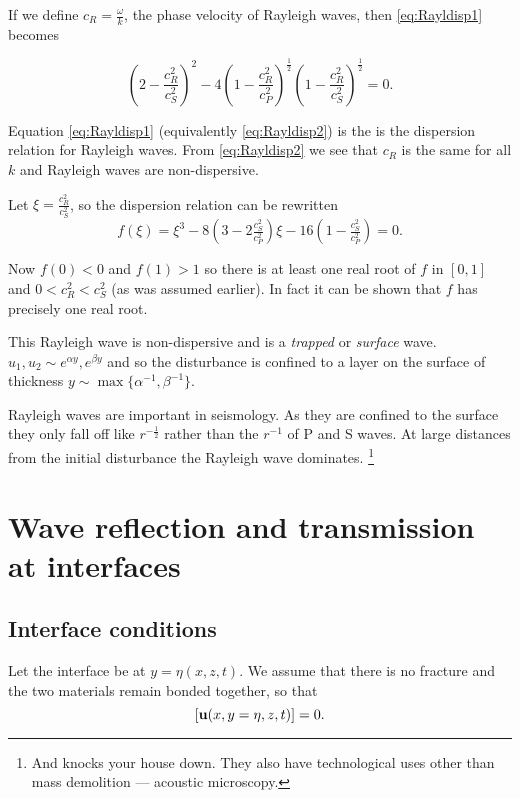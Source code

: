 \documentclass{notes}
\begin{document}
If we define $c_R = \tfrac{\omega}{k}$, the phase velocity of Rayleigh
waves, then \eqref{eq:Rayldisp1} becomes

\begin{equation}\label{eq:Rayldisp2}
\left( 2- \frac{c_R^2}{c_S^2} \right)^2 - 4 \left(1 - \frac{c_R^2}{c_P^2}
\right)^{\frac{1}{2}}
\left( 1 - \frac{c_R^2}{c_S^2} \right)^{\frac{1}{2}} = 0.
\end{equation}

Equation \eqref{eq:Rayldisp1} (equivalently \eqref{eq:Rayldisp2}) is the
is the dispersion relation for Rayleigh waves.  From \eqref{eq:Rayldisp2}
we see that $c_R$ is the same for all $k$ and Rayleigh waves are
non-dispersive.

Let $\xi = \tfrac{c_R^2}{c_S^2}$, so the dispersion relation can
be rewritten
\[
f(\xi) = \xi^3 - 8 \left( 3 - 2 \tfrac{c_S^2}{c_P^2}\right) \xi
- 16 \left(1 - \tfrac{c_S^2}{c_P^2}\right) = 0.
\] 

Now $f(0) < 0$ and $f(1) > 1$ so there is at least one real root of
$f$ in $[0,1]$ and $0 < c_R^2 < c_S^2$ (as was assumed earlier).  In fact
it can be shown that $f$ has precisely one real root.

This Rayleigh wave is non-dispersive and is a \emph{trapped} or
\emph{surface} wave.  $u_1, u_2 \sim e^{\alpha y}, e^{\beta y}$ and
so the disturbance is confined to a layer on the surface of thickness
$y \sim \max \{\alpha^{-1}, \beta^{-1}\}$.

Rayleigh waves are important in seismology.  As they are confined to
the surface they only fall off like $r^{-\frac{1}{2}}$ rather than the
$r^{-1}$ of P and S waves.  At large distances from the initial
disturbance the Rayleigh wave dominates.%
\footnote{And knocks your house down.  They also have technological
uses other than mass demolition --- acoustic microscopy.}

\section{Wave reflection and transmission at interfaces}

\vspace{1.5in}

\subsection{Interface conditions}

Let the interface be at $y = \eta(x,z,t)$.  We assume that there is
no fracture and the two materials remain bonded together, so that
\[
\left[ \mathbf{u}(x,y=\eta,z,t) \right] = 0.
\]
\end{document}
